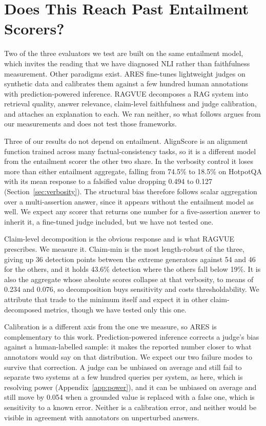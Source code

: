 \documentclass[11pt]{article}
\begin{document}
\section{Does This Reach Past Entailment Scorers?}
\label{sec:beyond-nli}

Two of the three evaluators we test are built on the same entailment model, which invites the reading that we have diagnosed NLI rather than faithfulness measurement. Other paradigms exist. ARES \citep{saad-falcon-etal-2024} fine-tunes lightweight judges on synthetic data and calibrates them against a few hundred human annotations with prediction-powered inference. RAGVUE \citep{murugaraj-etal-2026} decomposes a RAG system into retrieval quality, answer relevance, claim-level faithfulness and judge calibration, and attaches an explanation to each. We ran neither, so what follows argues from our measurements and does not test those frameworks.

Three of our results do not depend on entailment. AlignScore is an alignment function trained across many factual-consistency tasks, so it is a different model from the entailment scorer the other two share. In the verbosity control it loses more than either entailment aggregate, falling from 74.5\% to 18.5\% on HotpotQA with its mean response to a falsified value dropping 0.494 to 0.127 (Section~\ref{sec:verbosity}). The structural bias therefore follows scalar aggregation over a multi-assertion answer, since it appears without the entailment model as well. We expect any scorer that returns one number for a five-assertion answer to inherit it, a fine-tuned judge included, but we have not tested one.

Claim-level decomposition is the obvious response and is what RAGVUE prescribes. We measure it. Claim-min is the most length-robust of the three, giving up 36 detection points between the extreme generators against 54 and 46 for the others, and it holds 43.6\% detection where the others fall below 19\%. It is also the aggregate whose absolute scores collapse at that verbosity, to means of 0.234 and 0.076, so decomposition buys sensitivity and costs thresholdability. We attribute that trade to the minimum itself and expect it in other claim-decomposed metrics, though we have tested only this one.

Calibration is a different axis from the one we measure, so ARES is complementary to this work. Prediction-powered inference corrects a judge's bias against a human-labelled sample: it makes the reported number closer to what annotators would say on that distribution. We expect our two failure modes to survive that correction. A judge can be unbiased on average and still fail to separate two systems at a few hundred queries per system, as here, which is resolving power (Appendix~\ref{app:power}), and it can be unbiased on average and still move by 0.054 when a grounded value is replaced with a false one, which is sensitivity to a known error. Neither is a calibration error, and neither would be visible in agreement with annotators on unperturbed answers.
\end{document}
